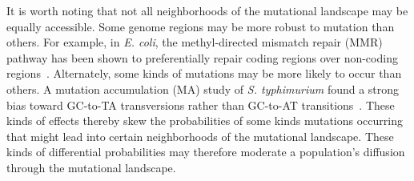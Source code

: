 \documentclass[10pt,letterpaper]{article}
\begin{document}
It is worth noting that not all neighborhoods of the mutational landscape may be equally accessible. Some genome regions may be more robust to mutation than others.
For example, in \textit{E. coli}, the methyl-directed mismatch repair (MMR) pathway has been shown to preferentially repair coding regions over non-coding regions~\cite{lee_rate_2012}. Alternately, some kinds of mutations may be more likely to occur than others. A mutation accumulation (MA) study of \textit{S. typhimurium} found a strong bias toward GC-to-TA transversions rather than GC-to-AT transitions~\cite{lind_whole-genome_2008}.
These kinds of effects thereby skew the probabilities of some kinds mutations occurring that might lead into certain neighborhoods of the mutational landscape. These kinds of differential probabilities may therefore moderate a population's diffusion through the mutational landscape.
%
%
\end{document}
